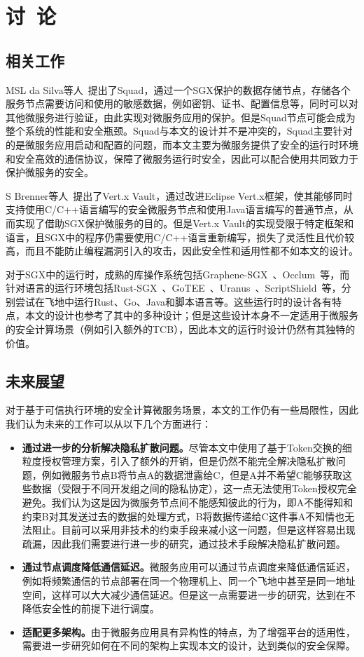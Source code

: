 \section{讨\ 论}\label{sec:discussion}

\subsection{相关工作}

MSL da Silva等人~\cite{}提出了Squad，通过一个SGX保护的数据存储节点，存储各个服务节点需要访问和使用的敏感数据，例如密钥、证书、配置信息等，同时可以对其他微服务进行验证，由此实现对微服务应用的保护。但是Squad节点可能会成为整个系统的性能和安全瓶颈。Squad与本文的设计并不是冲突的，Squad主要针对的是微服务应用启动和配置的问题，而本文主要为微服务提供了安全的运行时环境和安全高效的通信协议，保障了微服务运行时安全，因此可以配合使用共同致力于保护微服务的安全。

S Brenner等人~\cite{}提出了Vert.x Vault，通过改进Eclipse Vert.x框架，使其能够同时支持使用C/C++语言编写的安全微服务节点和使用Java语言编写的普通节点，从而实现了借助SGX保护微服务的目的。但是Vert.x Vault的实现受限于特定框架和语言，且SGX中的程序仍需要使用C/C++语言重新编写，损失了灵活性且代价较高，而且不能防止编程漏洞引入的攻击，因此安全性和适用性都不如本文的设计。

对于SGX中的运行时，成熟的库操作系统包括Graphene-SGX~\cite{}、Occlum~\cite{}等，而针对语言的运行环境包括Rust-SGX~\cite{}、GoTEE~\cite{}、Uranus~\cite{}、ScriptShield~\cite{}等，分别尝试在飞地中运行Rust、Go、Java和脚本语言等。这些运行时的设计各有特点，本文的设计也参考了其中的多种设计；但是这些设计本身不一定适用于微服务的安全计算场景（例如引入额外的TCB），因此本文的运行时设计仍然有其独特的价值。

\subsection{未来展望}

对于基于可信执行环境的安全计算微服务场景，本文的工作仍有一些局限性，因此我们认为未来的工作可以从以下几个方面进行：

\begin{itemize}
    \item \textbf{通过进一步的分析解决隐私扩散问题。}尽管本文中使用了基于Token交换的细粒度授权管理方案，引入了额外的开销，但是仍然不能完全解决隐私扩散问题，例如微服务节点B将节点A的数据泄露给C，但是A并不希望C能够获取这些数据（受限于不同开发组之间的隐私协定），这一点无法使用Token授权完全避免。我们认为这是因为微服务节点间不能感知彼此的行为，即A不能得知和约束B对其发送过去的数据的处理方式，B将数据传递给C这件事A不知情也无法阻止。目前可以采用非技术的约束手段来减小这一问题，但是这样容易出现疏漏，因此我们需要进行进一步的研究，通过技术手段解决隐私扩散问题。
    \item \textbf{通过节点调度降低通信延迟。}微服务应用可以通过节点调度来降低通信延迟，例如将频繁通信的节点部署在同一个物理机上、同一个飞地中甚至是同一地址空间，这样可以大大减少通信延迟。但是这一点需要进一步的研究，达到在不降低安全性的前提下进行调度。
    \item \textbf{适配更多架构。}由于微服务应用具有异构性的特点，为了增强平台的适用性，需要进一步研究如何在不同的架构上实现本文的设计，达到类似的安全保障。
\end{itemize}
